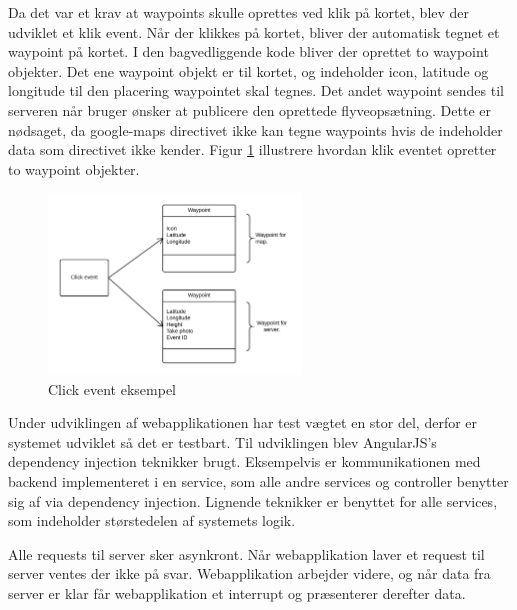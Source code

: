 Da det var et krav at waypoints skulle oprettes ved klik på kortet, blev der udviklet et klik event. 
Når der klikkes på kortet, bliver der automatisk tegnet et waypoint på kortet. 
I den bagvedliggende kode bliver der oprettet to waypoint objekter. 
Det ene waypoint objekt er til kortet, og indeholder icon, latitude og longitude til den placering waypointet skal tegnes.  Det andet waypoint sendes til serveren når bruger ønsker at publicere den oprettede flyveopsætning. 
Dette er nødsaget, da google-maps directivet ikke kan tegne waypoints hvis de indeholder data som directivet ikke kender. Figur \ref{fig:click_event} illustrere hvordan klik eventet opretter to waypoint objekter.

\vspace{-5pt}
\begin{figure}[H]
	\centering
	\includegraphics[width=0.6\textwidth]{Billeder/click_event.png}
	\vspace{-5pt}
	\caption{Click event eksempel}
	\label{fig:click_event}
\end{figure}


Under udviklingen af webapplikationen har test vægtet en stor del, derfor er systemet udviklet så det er testbart. Til udviklingen blev AngularJS's dependency injection teknikker brugt. Eksempelvis er kommunikationen med backend implementeret i en service, som alle andre services og controller benytter sig af via dependency injection. Lignende teknikker er benyttet for alle services, som indeholder størstedelen af systemets logik.  

Alle requests til server sker asynkront. Når webapplikation laver et request til server ventes der ikke på svar. Webapplikation arbejder videre, og når data fra server er klar får webapplikation et interrupt og præsenterer derefter data.